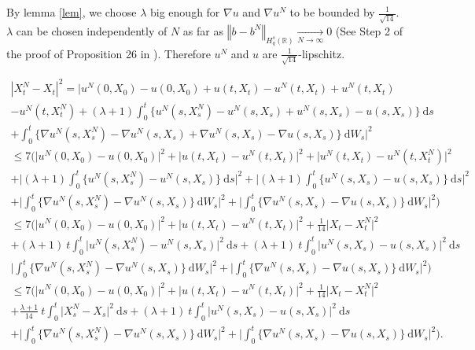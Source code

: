 \documentclass{article}[12pt]
\newcommand{\norme}[1]{\left\Vert #1\right\Vert}
\newcommand{\R}{\mathbb{R}}
\newcommand{\di}{\mathrm{d}}
\begin{document}
        By lemma \ref{lem}, we choose $\lambda$ big enough for $\nabla u$ and $\nabla u^N$ to be bounded by $\frac{1}{\sqrt{14}}$. $\lambda$ can be chosen independently of $N$ as far as $\norme{b - b^N}_{H_q^s(\R)} \underset{N\rightarrow\infty}{\longrightarrow} 0$ (See Step 2 of the proof of Proposition 26 in \cite{Fla-Iss-Rus-2017}). Therefore $u^N$ and $u$ are $\frac{1}{\sqrt{14}}$-lipschitz.
        
        \begin{multline*}
        \left|X^{N}_t-X_t\right|^2 = \bigg|u^N(0,X_0) - u(0,X_0) + u(t,X_t) - u^N(t,X_t)+ u^N(t,X_t)\\- u^N(t,X_t^N) + (\lambda+1)\int_0^t \{u^N(s,X_s^N)- u^N(s,X_s) + u^N(s,X_s) - u(s,X_s)\}\ \di s \\+ \int_0^t \{\nabla u^N(s,X_s^N) - \nabla u^N(s,X_s) + \nabla u^N(s,X_s) - \nabla u(s,X_s)\}\ \di W_s\bigg|^2
        \end{multline*}
        \begin{multline*}
        \leq 7\Bigg(\Big|u^N(0,X_0) - u(0,X_0)\Big|^2 + \Big|u(t,X_t) - u^N(t,X_t)\Big|^2 + \Big|u^N(t,X_t)- u^N(t,X_t^N)\Big|^2\\ + \bigg|(\lambda+1)\int_0^t \{u^N(s,X_s^N)- u^N(s,X_s)\}\ \di s\bigg|^2 + \bigg|(\lambda+1)\int_0^t \{u^N(s,X_s) - u(s,X_s)\}\ \di s\bigg|^2 \\+ \bigg|\int_0^t \{\nabla u^N(s,X_s^N) - \nabla u^N(s,X_s)\}\ \di W_s\bigg|^2 + \bigg|\int_0^t \{\nabla u^N(s,X_s) - \nabla u(s,X_s)\}\ \di W_s\bigg|^2 \Bigg)
        \end{multline*}
        \begin{multline*}
        \leq 7\Bigg(\Big|u^N(0,X_0) - u(0,X_0)\Big|^2 + \Big|u(t,X_t) - u^N(t,X_t)\Big|^2 + \frac{1}{14}\big|X_t- X_t^N\big|^2\\ + (\lambda+1)\ t\int_0^t \big|u^N(s,X_s^N)- u^N(s,X_s)\big|^2\ \di s + (\lambda+1)\ t\int_0^t \big|u^N(s,X_s) - u(s,X_s)\big|^2\ \di s \\\bigg|\int_0^t \{\nabla u^N(s,X_s^N) - \nabla u^N(s,X_s)\}\ \di W_s\bigg|^2 + \bigg|\int_0^t \{\nabla u^N(s,X_s) - \nabla u(s,X_s)\}\ \di W_s\bigg|^2 \Bigg)
        \end{multline*}
        \begin{multline*}
        \leq 7\Bigg(\Big|u^N(0,X_0) - u(0,X_0)\Big|^2 + \Big|u(t,X_t) - u^N(t,X_t)\Big|^2 + \frac{1}{14}\big|X_t- X_t^N\big|^2\\ + \frac{\lambda+1}{14}\ t\int_0^t \big|X_s^N- X_s\big|^2\ \di s + (\lambda+1)\ t\int_0^t \big|u^N(s,X_s) - u(s,X_s)\big|^2\ \di s \\+ \bigg|\int_0^t \{\nabla u^N(s,X_s^N) - \nabla u^N(s,X_s)\}\ \di W_s\bigg|^2 + \bigg|\int_0^t \{\nabla u^N(s,X_s) - \nabla u(s,X_s)\}\ \di W_s\bigg|^2 \Bigg).
        \end{multline*}
        
\end{document}
